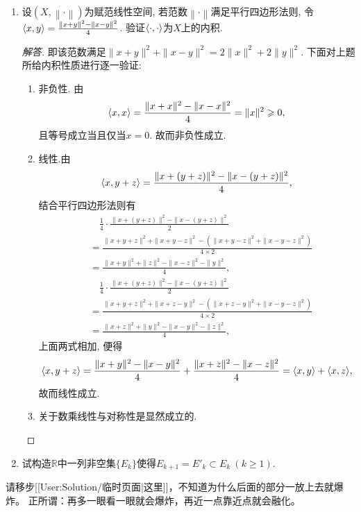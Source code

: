 \begin{3b}
\begin{enumerate}
\begin{proof}
易见\begin{align*}
\left\|x+y\right\|^2+\left\|x-y\right\|^2&=\inp{x+y,x+y}+\inp{x-y,x-y}\\
&=\inp{x,x}+2\inp{x,y}+\inp{y,y}+\inp{x,x}-2\inp{x,y}+\inp{y,y}\\
&=2\inp{x,x}+2\inp{y,y}=2\left\|x\right\|^2+2\left\|y\right\|^2.
\end{align*}
\end{proof}
\item 设\((X,\left\|\cdot\right\|)\)为赋范线性空间, 
若范数\(\left\|\cdot\right\|\)满足平行四边形法则, 
令\(\langle x,y \rangle=\frac{\left\|x+y\right\|^2-\left\|x-y\right\|^2}{4}\). 
验证\(\langle \cdot,\cdot \rangle\)为\(X\)上的内积.
\begin{proof}[解答]
即该范数满足\(\|x+y\|^2+\|x-y\|^2=2\|x\|^2+2\|y\|^2.\) 下面对上题所给内积性质进行逐一验证:
\begin{enumerate}[label=(\arabic*)]
    \item 非负性. 由\[\langle x,x \rangle=\frac{\|x+x\|^2-\|x-x\|^2}{4}=\|x\|^2\geqslant 0,\]
    且等号成立当且仅当\(x=0\). 故而非负性成立.
    \item 线性.由\[\langle x,y+z \rangle=\frac{\|x+(y+z)\|^2-\|x-(y+z)\|^2}{4},\]
    结合平行四边形法则有\[\begin{split}
    &\quad\frac{1}{4}\cdot\frac{\|x+(y+z)\|^2-\|x-(y+z)\|^2}{2}\\
    &=\frac{\|x+y+z\|^2+\|x+y-z\|^2-\left(\|x+y-z\|^2+\|x-y-z\|^2\right)}{4\times2}\\
    &=\frac{\|x+y\|^2+\|z\|^2-\|x-z\|^2-\|y\|^2}{4},\\
    &\quad\frac{1}{4}\cdot\frac{\|x+(y+z)\|^2-\|x-(y+z)\|^2}{2}\\
    &=\frac{\|x+y+z\|^2+\|x+z-y\|^2-\left(\|x+z-y\|^2+\|x-y-z\|^2\right)}{4\times 2}\\
    &=\frac{\|x+z\|^2+\|y\|^2-\|x-y\|^2-\|z\|^2}{4},
    \end{split}\]上面两式相加, 便得\[\langle x,y+z \rangle=\frac{\|x+y\|^2-\|x-y\|^2}{4}+\frac{\|x+z\|^2-\|x-z\|^2}{4}=\langle x,y \rangle+\langle x,z \rangle,\]故而线性成立.
    \item 关于数乘线性与对称性是显然成立的.\qedhere
\end{enumerate}
\end{proof}
\item 试构造\(\mathbb{R}\)中一列非空集\(\{E_k\}\)使得\(E_{k+1}=E'_k\subset E_k\ (k\geqslant 1)\).
\end{enumerate}
\end{3b}

请移步[[User:Solution/临时页面|这里]]，不知道为什么后面的部分一放上去就爆炸。
正所谓：再多一眼看一眼就会爆炸，再近一点靠近点就会融化。